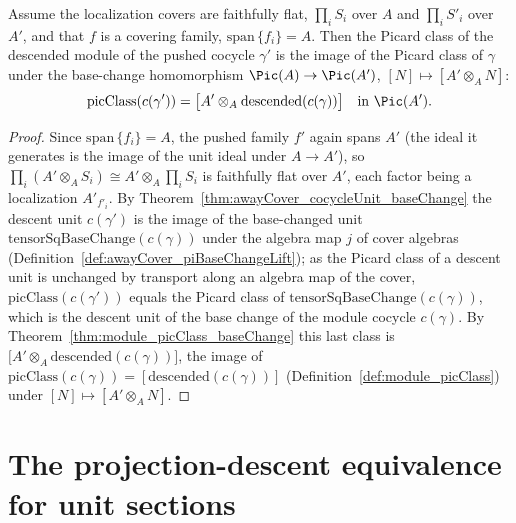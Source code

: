 \begin{theorem}
  \label{thm:awayCover_pic_baseChange}
  \leanok
  Assume the localization covers are faithfully flat, \(\prod_i S_i\) over \(A\) and \(\prod_i
  S'_i\) over \(A'\), and that \(f\) is a covering family, \(\mathrm{span}\,\{f_i\} = A\).  Then
  the Picard class of the descended module of the pushed cocycle \(\gamma'\) is the image of the
  Picard class of \(\gamma\) under the base-change homomorphism \(\Pic(A) \to \Pic(A')\),
  \([N] \mapsto [A' \otimes_A N]\):
  \[
    \mathrm{picClass}(c(\gamma')) = \bigl[A' \otimes_A \mathrm{descended}(c(\gamma))\bigr]
    \quad\text{in }\Pic(A').
  \]
\end{theorem}
\begin{proof}
  \leanok
  Since \(\mathrm{span}\,\{f_i\} = A\), the pushed family \(f'\) again spans \(A'\) (the ideal it
  generates is the image of the unit ideal under \(A \to A'\)), so \(\prod_i (A' \otimes_A S_i)
  \cong A' \otimes_A \prod_i S_i\) is faithfully flat over \(A'\), each factor being a
  localization \(A'_{f'_i}\).  By Theorem~\ref{thm:awayCover_cocycleUnit_baseChange} the descent
  unit \(c(\gamma')\) is the image of the base-changed unit
  \(\mathrm{tensorSqBaseChange}(c(\gamma))\) under the algebra map \(j\) of cover algebras
  (Definition~\ref{def:awayCover_piBaseChangeLift}); as the Picard class of a descent unit is
  unchanged by transport along an algebra map of the cover, \(\mathrm{picClass}(c(\gamma'))\)
  equals the Picard class of \(\mathrm{tensorSqBaseChange}(c(\gamma))\), which is the descent
  unit of the base change of the module cocycle \(c(\gamma)\).  By
  Theorem~\ref{thm:module_picClass_baseChange} this last class is \(\bigl[A' \otimes_A
  \mathrm{descended}(c(\gamma))\bigr]\), the image of
  \(\mathrm{picClass}(c(\gamma)) = [\mathrm{descended}(c(\gamma))]\)
  (Definition~\ref{def:module_picClass}) under \([N] \mapsto [A' \otimes_A N]\).
\end{proof}

\section{The projection-descent equivalence for unit sections}
\label{sec:projectionUnits}

